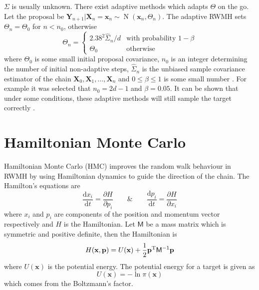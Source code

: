 \documentclass[10pt]{proc}
\DeclareMathOperator{\normal}{N}
\newcommand{\diff}{\mathrm{d}}
\newcommand{\T}{^\textup{T}}
\newcommand{\dotdotdot}{...}
\newcommand{\vect}[1]{\mathbf{#1}}
\newcommand{\matr}[1]{\mathsf{#1}}
\begin{document}
$\matr{\Sigma}$ is usually unknown. There exist adaptive methods \citep{haario2001adaptive} \citep{roberts2009examples} which adapts $\matr{\Theta}$ on the go. Let the proposal be $\vect{Y}_{n+1}|\vect{X}_n=\vect{x}_n\sim \normal\left(\vect{x}_n,\matr{\Theta}_n\right)$. The adaptive RWMH sets $\matr{\Theta}_{n}=\matr{\Theta}_0$ for $n<n_0$, otherwise
\begin{equation}
\matr{\Theta}_{n} =
\begin{cases}
2.38^2 \widehat{\matr{\Sigma}}_n/d & \text{with probability }1-\beta \\
\matr{\Theta}_0 & \text{otherwise}
\end{cases}
\end{equation}
where $\matr{\Theta}_0$ is some small initial proposal covariance, $n_0$ is an integer determining the number of initial non-adaptive steps, $\widehat{\matr{\Sigma}}_n$ is the unbiased sample covariance estimator of the chain $\vect{X}_0,\vect{X}_1,\dotdotdot,\vect{X}_n$ and $0\leqslant\beta\leqslant 1$ is some small number \citep{roberts2009examples}. For example it was selected that $n_0= 2d-1$ and $\beta = 0.05$. It can be shown that under some conditions, these adaptive methods will still sample the target correctly \citep{rosenthal2007coupling}.

\section{Hamiltonian Monte Carlo}
Hamiltonian Monte Carlo (HMC) \citep{neal2011mcmc} improves the random walk behaviour in RWMH by using Hamiltonian dynamics to guide the direction of the chain. The Hamilton's equations are
\begin{equation}
\dfrac{\diff x_i}{\diff t}=\dfrac{\partial H}{\partial p_i}
\qquad\&\qquad
\dfrac{\diff p_i}{\diff t}=\dfrac{\partial H}{\partial x_i}
\end{equation}
where $x_i$ and $p_i$ are components of the position and momentum vector respectively and $H$ is the Hamiltonian. Let $\matr{M}$ be a mass matrix which is symmetric and positive definite, then the Hamiltonian is
\begin{equation}
H(\vect{x},\vect{p})=U(\vect{x}) + \dfrac{1}{2}\vect{p}\T\matr{M}^{-1}\vect{p}
\end{equation}
where $U(\vect{x})$ is the potential energy. The potential energy for a target is given as
\begin{equation}
U(\vect{x}) = -\ln\pi(\vect{x})
\end{equation}
which comes from the Boltzmann's factor.
\end{document}
